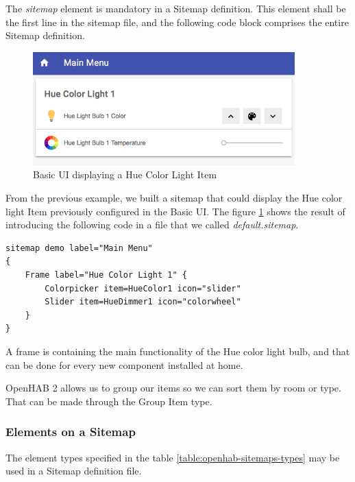 The \textit{sitemap} element is mandatory in a Sitemap definition. This element shall be the first line in the sitemap file, and the
following code block comprises the entire Sitemap definition.\cite{openHABDocs}

\begin{figure}
    \centering
    \includegraphics[width=0.9\textwidth]{images/Chapter_07/hue-bulb-sitemap.png}
    \caption{Basic UI displaying a Hue Color Light Item}
    \label{fig:hue-bulb-sitemap}
\end{figure}

From the previous example, we built a sitemap that could display the Hue color light Item previously configured in the Basic UI.
The figure \ref{fig:hue-bulb-sitemap} shows the result of introducing the following code in a file that we called \textit{default.sitemap}.

\begin{lstlisting}[style=Consola]
sitemap demo label="Main Menu"
{
    Frame label="Hue Color Light 1" {
        Colorpicker item=HueColor1 icon="slider"
        Slider item=HueDimmer1 icon="colorwheel"
    }
}
\end{lstlisting}

A frame is containing the main functionality of the Hue color light bulb, and that can be done for every new component installed at home.

OpenHAB 2 allows us to group our items so we can sort them by room or type. That can be made through the Group Item type.

\subsubsection{Elements on a Sitemap}
The element types specified in the table \ref{table:openhab-sitemaps-types} may be used in a Sitemap definition file.

